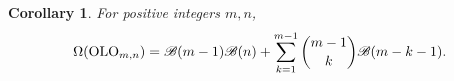 \documentclass{article}
\theoremstyle{plain}
\newtheorem{Cor}[Thm]{Corollary}
\theoremstyle{definition}
\renewcommand{\S}{\mathcal{S}}
\newcommand{\T}{\mathcal{T}}
\newcommand{\Q}{\mathbb{Q}}
\newcommand{\B}{\mathscr{B}}
\renewcommand{\O}{\mathrm{O}}
\newcommand{\LO}{\mathrm{LO}}
\newcommand{\OLO}{\mathrm{OLO}}
\begin{document}
\begin{Cor}\label{cor:olo} For positive integers $m,n$, 
\[\Omega(\OLO_{m,n}) = \B(m-1)\B(n) + \sum_{k=1}^{m-1} \dbinom{m-1}{k}\B(m-k-1).\]
\end{Cor}




\end{document}
